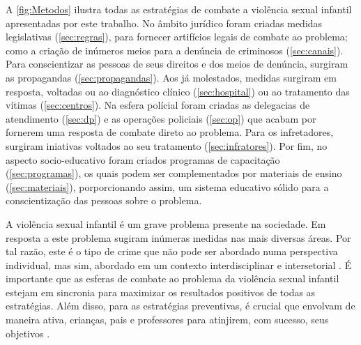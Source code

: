 A \autoref{fig:Metodos} ilustra todas as estratégias de combate a violência sexual infantil apresentadas por este trabalho. No âmbito jurídico foram criadas medidas legislativas (\autoref{sec:regras}), para fornecer artifícios legais de combate ao problema; como a criação de inúmeros meios para a denúncia de criminosos (\autoref{sec:canais}). Para conscientizar as pessoas de seus direitos e dos meios de denúncia, surgiram as propagandas (\autoref{sec:propagandas}). Aos já molestados, medidas surgiram em resposta, voltadas ou ao diagnóstico clínico (\autoref{sec:hospital}) ou ao tratamento das vítimas (\autoref{sec:centros}). Na esfera polícial foram criadas as delegacias de atendimento (\autoref{sec:dp}) e as operações policiais (\autoref{sec:op}) que acabam por fornerem uma resposta de combate direto ao problema. Para os infretadores, surgiram iniativas voltados ao seu tratamento  (\autoref{sec:infratores}). Por fim, no aspecto socio-educativo foram criados programas de capacitação (\autoref{sec:programas}), os quais podem ser complementados por materiais de ensino (\autoref{sec:materiais}), porporcionando assim, um sistema educativo sólido para a conscientização das pessoas sobre o problema. 

\vspace{-0.35cm}

A violência sexual infantil é um grave problema presente na sociedade. Em resposta a este problema sugiram inúmeras medidas nas mais diversas áreas. Por tal razão, este é o tipo de crime que não pode ser abordado numa perspectiva individual, mas sim, abordado em um contexto interdisciplinar e intersetorial \cite{maria2010papel, pinto2017avaliaccao}. %
É importante que as esferas de combate ao problema da violência sexual infantil estejam em sincronia para maximizar os resultados positivos de todas as estratégias. Além disso, para as estratégias preventivas, é crucial que envolvam de maneira ativa, crianças, pais
e professores para atinjirem, com sucesso, seus objetivos \cite{dip2016advancing}. 




